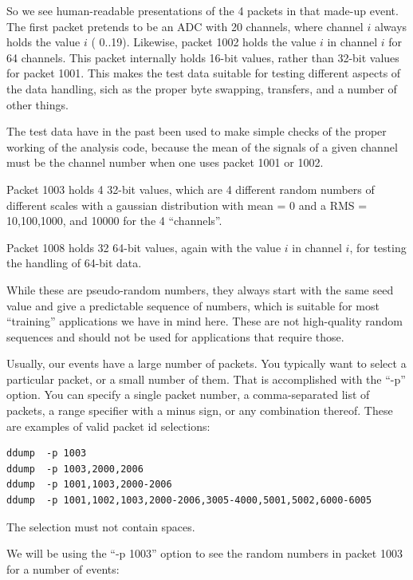 \documentclass{article}[11pt]
\begin{document}
So we see human-readable presentations of the 4 packets in that
made-up event. The first packet pretends to be an ADC with 20
channels, where channel $i$ always holds the value $i$ ( 0..19).
Likewise, packet 1002 holds the value $i$ in channel $i$ for 64
channels. This packet internally holds 16-bit values, rather than
32-bit values for packet 1001. This makes the test data suitable for
testing different aspects of the data handling, sich as the proper
byte swapping, transfers, and a number of other things.

The test data have in the past been used to make simple checks of the
proper working of the analysis code, because the mean of the signals
of a given channel must be the channel number when one uses packet
1001 or 1002.

Packet 1003 holds 4 32-bit values, which are 4 different random
numbers of different scales with a gaussian distribution with mean = 0
and a RMS = 10,100,1000, and 10000 for the 4 ``channels''.

Packet 1008 holds 32 64-bit values, again with the value $i$ in channel
$i$, for testing the handling of 64-bit data.

While these are pseudo-random numbers, they always start with the same
seed value and give a predictable sequence of numbers, which is
suitable for most ``training'' applications we have in mind
here. These are not high-quality random sequences and should not be
used for applications that require those.

Usually, our events have a large number of packets. You typically want
to select a particular packet, or a small number of them. That is
accomplished with the ``-p'' option. You can specify a single packet
number, a comma-separated list of packets, a range specifier with a
minus sign, or any combination thereof. These are examples of valid
packet id selections:

\begin{verbatim}
ddump  -p 1003
ddump  -p 1003,2000,2006
ddump  -p 1001,1003,2000-2006
ddump  -p 1001,1002,1003,2000-2006,3005-4000,5001,5002,6000-6005
\end{verbatim}
The selection must not contain spaces. 

We will be using the ``-p 1003'' option to see the random numbers in
packet 1003 for a number of events:
\end{document}
